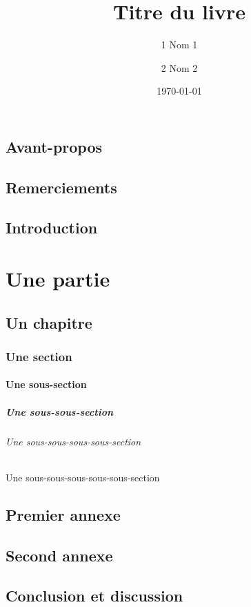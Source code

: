 \documentclass[a4paper,11pt]{book}
\title{Titre du livre}
\author{ 1 Nom 1 \and 2 Nom 2}
\date{\today}
\begin{document}
\dominitoc

\maketitle
 
    \frontmatter
 
    \chapter{Avant-propos}
    \chapter{Remerciements}
    \chapter{Introduction}
 
    \mainmatter

    \tableofcontents
    
    \part{Une partie}
    
    \chapter{Un chapitre}

    \minitoc

    \section{Une section}

    \subsection{Une sous-section}

    \subsubsection{Une sous-sous-section}

    \paragraph{Une sous-sous-sous-sous-section}
    \subparagraph{Une sous-sous-sous-sous-sous-section}
 
    \appendix
 
    \chapter{Premier annexe}
    \chapter{Second annexe}
 
    
    \backmatter
 
    \chapter{Conclusion et discussion}
 
    
    \tableofcontents    
    \listoffigures        %
    \listoftables        %
 
\end{document}
